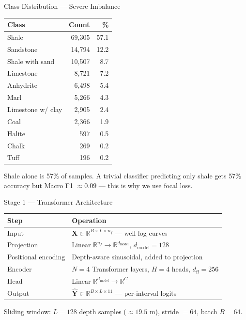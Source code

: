\documentclass[aspectratio=169,11pt]{beamer}
\newcommand{\acc}[1]{{\color{Accent}#1}}
\newcommand{\mut}[1]{{\color{Muted}#1}}
\newcommand{\dmodel}{d_{\mathrm{model}}}
\begin{document}
\begin{frame}{Class Distribution — Severe Imbalance}
  \begin{footnotesize}
  \begin{tabular}{l r r}
    \toprule
    \textbf{Class} & \textbf{Count} & \textbf{\%}\\
    \midrule
    Shale              & 69,305 & 57.1\\
    Sandstone          & 14,794 & 12.2\\
    Shale with sand    & 10,507 &  8.7\\
    Limestone          &  8,721 &  7.2\\
    Anhydrite          &  6,498 &  5.4\\
    Marl               &  5,266 &  4.3\\
    Limestone w/ clay  &  2,905 &  2.4\\
    Coal               &  2,366 &  1.9\\
    Halite             &    597 &  0.5\\
    Chalk              &    269 &  0.2\\
    Tuff               &    196 &  0.2\\
    \bottomrule
  \end{tabular}
  \end{footnotesize}

  \vspace{1em}
  \acc{Shale alone is 57\% of samples.} A trivial classifier predicting only shale gets 57\% accuracy but Macro F1 $\approx 0.09$ — this is why we use focal loss.
\end{frame}

\begin{frame}{Stage 1 — Transformer Architecture}
  \begin{footnotesize}
  \begin{tabular}{ll}
    \toprule
    \textbf{Step} & \textbf{Operation}\\
    \midrule
    Input         & $\mathbf{X} \in \mathbb{R}^{B \times L \times n_f}$ — well log curves\\
    Projection    & Linear $\mathbb{R}^{n_f} \to \mathbb{R}^{\dmodel}$, $\dmodel=128$\\
    Positional encoding & Depth-aware sinusoidal, added to projection\\
    Encoder       & $N=4$ Transformer layers, $H=4$ heads, $d_\text{ff}=256$\\
    Head          & Linear $\mathbb{R}^{\dmodel} \to \mathbb{R}^C$\\
    Output        & $\hat{\mathbf{Y}} \in \mathbb{R}^{B \times L \times 11}$ — per-interval logits\\
    \bottomrule
  \end{tabular}
  \end{footnotesize}

  \vspace{1em}
  \mut{Sliding window: $L=128$ depth samples ($\approx 19.5$ m), stride $= 64$, batch $B=64$.}
\end{frame}
\end{document}
